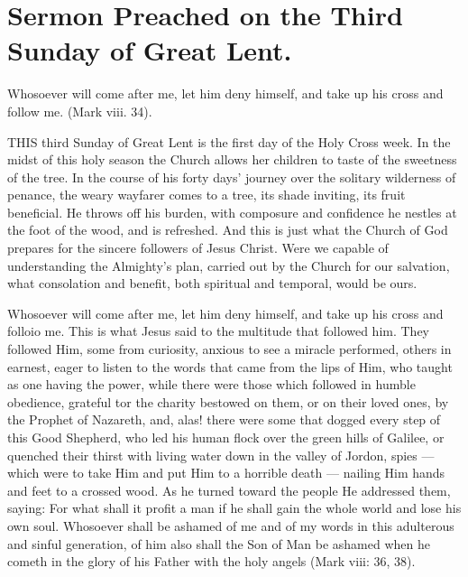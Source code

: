 \chapter{Sermon Preached on the Third Sunday of Great Lent.}

Whosoever will come after me, let him deny himself, and take up his cross and follow me. (Mark viii. 34).

THIS third Sunday of Great Lent is the first 
day of the Holy Cross week. In the midst 
of this holy season the Church allows her children
to taste of the sweetness of the tree. In 
the course of his forty days' journey over the 
solitary wilderness of penance, the weary wayfarer
comes to a tree, its shade inviting, its fruit 
beneficial. He throws off his burden, with composure
and confidence he nestles at the foot of 
the wood, and is refreshed. And this is just 
what the Church of God prepares for the sincere
followers of Jesus Christ. Were we capable 
of understanding the Almighty's plan, carried 
out by the Church for our salvation, what consolation
and benefit, both spiritual and temporal,
would be ours. 

Whosoever will come after me, let him deny 
himself, and take up his cross and folloio me. 
This is what Jesus said to the multitude that
followed him. They followed Him, some from 
curiosity, anxious to see a miracle performed, 
others in earnest, eager to listen to the words 
that came from the lips of Him, who taught as 
one having the power, while there were those 
which followed in humble obedience, grateful 
tor the charity bestowed on them, or on their 
loved ones, by the Prophet of Nazareth, and, 
alas! there were some that dogged every step of 
this Good Shepherd, who led his human flock 
over the green hills of Galilee, or quenched 
their thirst with living water down in the valley 
of Jordon, spies — which were to take Him and 
put Him to a horrible death — nailing Him hands 
and feet to a crossed wood. As he turned toward
the people He addressed them, saying: 
For what shall it profit a man if he shall gain 
the whole world and lose his own soul. Whosoever
shall be ashamed of me and of my words 
in this adulterous and sinful generation, of him 
also shall the Son of Man be ashamed when he 
cometh in the glory of his Father with the holy 
angels (Mark viii: 36, 38). 

